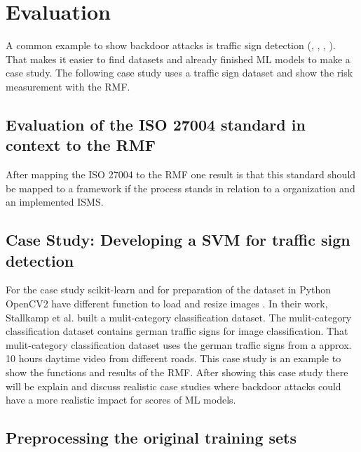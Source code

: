 \section{Evaluation}
\label{sec:evaluation}

A common example to show backdoor attacks is traffic sign detection (\cite{DBLP:journals/corr/abs-2102-10369}, \cite{DBLP:journals/corr/abs-1708-06733}, \cite{DBLP:conf/codaspy/NudingM20}, \cite{DBLP:journals/tdsc/LiXZZZ21}). That makes it easier to find datasets and already finished ML models to make a case study. The following case study uses a traffic sign dataset and show the risk measurement with the RMF.

\subsection{Evaluation of the ISO 27004 standard in context to the RMF}

After mapping the ISO 27004 to the RMF one result is that this standard should be mapped to a framework if the process stands in relation to a organization and an implemented ISMS.

\subsection{Case Study: Developing a SVM for traffic sign detection}

For the case study scikit-learn \cite{scikit-learn} and for preparation of the dataset in Python OpenCV2 have different function to load and resize images \cite{opencv_library}. In their work, Stallkamp et al. \cite{DBLP:conf/ijcnn/StallkampSSI11} built a mulit-category classification dataset. The mulit-category classification dataset contains german traffic signs for image classification. That mulit-category classification dataset uses the german traffic signs from a approx. 10 hours daytime video from different roads.
This case study is an example to show the functions and results of the RMF. After showing this case study there will be explain and discuss realistic case studies where backdoor attacks could have a more realistic impact for scores of ML models.

\subsection{Preprocessing the original training sets}

